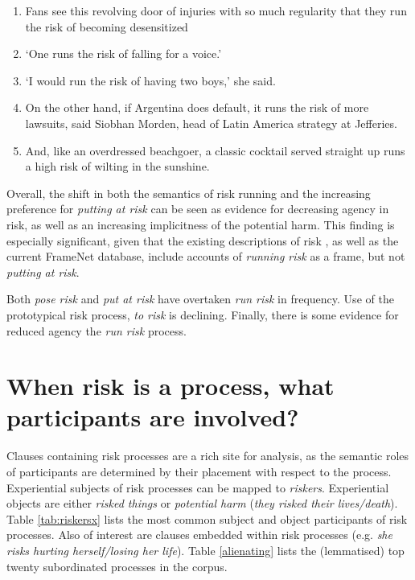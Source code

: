     \begin{enumerate} [before=\itshape,font=\normalfont]   \setlength\itemsep{0em} \small
    \item Fans see this revolving door of injuries with so much regularity that they run the risk of becoming desensitized 
    \item `One runs the risk of falling for a voice.'
    \item `I would run the risk of having two boys,' she said.
    \item On the other hand, if Argentina does default, it runs the risk of more lawsuits, said Siobhan Morden, head of Latin America strategy at Jefferies.
    \item And, like an overdressed beachgoer, a classic cocktail served straight up runs a high risk of wilting in the sunshine.
    \end{enumerate}
    Overall, the shift in both the semantics of risk running and the increasing preference for \emph{putting at risk} can be seen as evidence for decreasing agency in risk, as well as an increasing implicitness of the potential harm. This finding is especially significant, given that the existing descriptions of risk \cite{fillmore_toward_1992}, as well as the current FrameNet database, include accounts of \emph{running risk} as a frame, but not \emph{putting at risk}.

    \vspace{5mm}\noindent\begin{tcolorbox}[colback=yellow!5,colframe=yellow!40!black,title=Summary: types of risk processes]
    \parbox{1\textwidth}{%
    Both \emph{pose risk} and \emph{put at risk} have overtaken \emph{run risk} in frequency. Use of the prototypical risk process, \emph{to risk} is declining. Finally, there is some evidence for reduced agency the \emph{run risk} process.}
    \end{tcolorbox}
    \vspace{5mm}
    
\section{When risk is a process, what participants are involved?} \FloatBarrier
    
    Clauses containing risk processes are a rich site for analysis, as the semantic roles of participants are determined by their placement with respect to the process. Experiential subjects of risk processes can be mapped to \emph{riskers}. Experiential objects are either \emph{risked things} or \emph{potential harm} (\emph{they risked their lives/death}). Table \ref{tab:riskersx} lists the most common subject and object participants of risk processes. Also of interest are clauses embedded within risk processes (e.g. \emph{she risks hurting herself/losing her life}). Table \ref{alienating} lists the (lemmatised) top twenty subordinated processes in the corpus.

